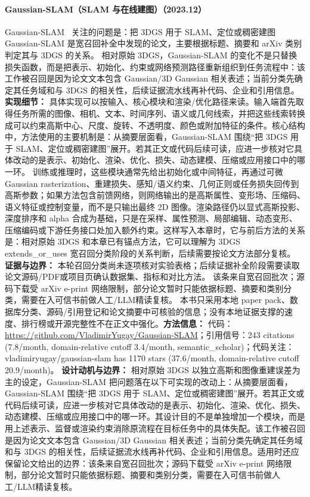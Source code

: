 \paragraph{Gaussian-SLAM（SLAM 与在线建图）（2023.12）}
Gaussian-SLAM~\cite{2312_10070} 关注的问题是：把 3DGS 用于 SLAM、定位或稠密建图 Gaussian-SLAM 是宽召回补全中发现的论文，主要根据标题、摘要和 arXiv 类别判定其与 3DGS 的关系。
相对原始 3DGS，Gaussian-SLAM 的变化不是只替换损失函数，而是把表示、初始化、约束或网络预测路径重新组织到任务流程中：该工作被召回是因为论文文本包含 Gaussian/3D Gaussian 相关表述；当前分类先确定其任务域和与 3DGS 的相关性，后续证据流水线再补代码、企业和引用信息。
\textbf{实现细节：} 具体实现可以按输入、核心模块和渲染/优化路径来读。输入端首先取得任务所需的图像、相机、文本、时间序列、语义或几何线索，并把这些线索转换成可以约束高斯中心、尺度、旋转、不透明度、颜色或附加特征的条件。核心结构中，方法使用的主要机制是：从摘要层面看，Gaussian-SLAM 围绕“把 3DGS 用于 SLAM、定位或稠密建图”展开。若其正文或代码后续可读，应进一步核对它具体改动的是表示、初始化、渲染、优化、损失、动态建模、压缩或应用接口中的哪一环。 训练或推理时，这些模块通常先给出初始化或中间特征，再通过可微 Gaussian rasterization、重建损失、感知/语义约束、几何正则或任务损失回传到高斯参数；如果方法包含前馈网络，则网络输出的是高斯属性、变形场、压缩码、语义特征或控制变量，而不是只输出最终 2D 图像。渲染路径仍以显式高斯投影、深度排序和 alpha 合成为基础，只是在采样、属性预测、局部编辑、动态变形、压缩编码或下游任务接口处加入额外约束。这样写入本章时，它与前后方法的关系是：相对原始 3DGS 和本章已有锚点方法，它可以理解为 3DGS extends\_or\_uses 宽召回分类阶段的关系判断，后续需要按论文方法部分复核。
\textbf{证据与边界：} 本轮召回分类尚未逐项核对实验表格；后续证据补全阶段需要读取论文源码/PDF或项目页确认数据集、指标和对比方法。 该条来自宽召回批次；源码下载受 arXiv e-print 网络限制，部分论文暂时只能依据标题、摘要和类别分类，需要在入可信书前做人工/LLM精读复核。 本书只采用本地 paper pack、数据库分类、源码/引用登记和论文摘要中可核验的信息；没有本地证据支撑的速度、排行榜或开源完整性不在正文中强化。\textbf{方法信息：} 代码：\url{https://github.com/VladimirYugay/Gaussian-SLAM}；引用信号：243 citations (7.8/month, domain-relative cutoff 3.4/month, semantic\_scholar)；代码关注：vladimiryugay/gaussian-slam has 1170 stars (37.6/month, domain-relative cutoff 20.9/month)。
\textbf{设计动机与边界：} 相对原始 3DGS 以独立高斯和图像重建误差为主的设定，Gaussian-SLAM 把问题落在以下可实现的改动上：从摘要层面看，Gaussian-SLAM 围绕“把 3DGS 用于 SLAM、定位或稠密建图”展开。若其正文或代码后续可读，应进一步核对它具体改动的是表示、初始化、渲染、优化、损失、动态建模、压缩或应用接口中的哪一环。其设计目的不是单独增加一个模块，而是用上述表示、监督或渲染约束消除原流程在目标任务中的具体失配。该工作被召回是因为论文文本包含 Gaussian/3D Gaussian 相关表述；当前分类先确定其任务域和与 3DGS 的相关性，后续证据流水线再补代码、企业和引用信息。适用时还应保留论文给出的边界：该条来自宽召回批次；源码下载受 arXiv e-print 网络限制，部分论文暂时只能依据标题、摘要和类别分类，需要在入可信书前做人工/LLM精读复核。
